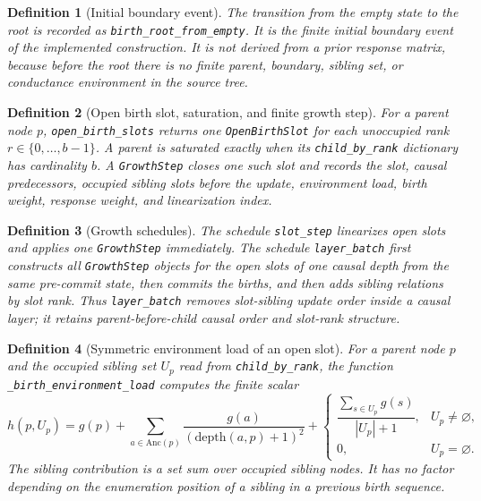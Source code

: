 \documentclass[11pt]{article}
\newtheorem{definition}{Definition}[section]
\theoremstyle{remark}
\newcommand{\code}[1]{\texttt{#1}}
\numberwithin{equation}{section}
\begin{document}
\begin{definition}[Initial boundary event]
The transition from the empty state to the root is recorded as \code{birth\_\allowbreak{}root\_\allowbreak{}from\_\allowbreak{}empty}. It is the finite initial boundary event of the implemented construction. It is not derived from a prior response matrix, because before the root there is no finite parent, boundary, sibling set, or conductance environment in the source tree.
\end{definition}

\begin{definition}[Open birth slot, saturation, and finite growth step]
For a parent node \(p\), \code{open\_\allowbreak{}birth\_\allowbreak{}slots} returns one \code{OpenBirthSlot} for each unoccupied rank \(r\in\{0,\ldots,b-1\}\). A parent is saturated exactly when its \code{child\_\allowbreak{}by\_\allowbreak{}rank} dictionary has cardinality \(b\). A \code{GrowthStep} closes one such slot and records the slot, causal predecessors, occupied sibling slots before the update, environment load, birth weight, response weight, and linearization index.
\end{definition}

\begin{definition}[Growth schedules]
The schedule \code{slot\_\allowbreak{}step} linearizes open slots and applies one \code{GrowthStep} immediately. The schedule \code{layer\_\allowbreak{}batch} first constructs all \code{GrowthStep} objects for the open slots of one causal depth from the same pre-commit state, then commits the births, and then adds sibling relations by slot rank. Thus \code{layer\_\allowbreak{}batch} removes slot-sibling update order inside a causal layer; it retains parent-before-child causal order and slot-rank structure.
\end{definition}

\begin{definition}[Symmetric environment load of an open slot]
For a parent node \(p\) and the occupied sibling set \(U_p\) read from \code{child\_\allowbreak{}by\_\allowbreak{}rank}, the function \code{\_birth\_\allowbreak{}environment\_\allowbreak{}load} computes the finite scalar
\begin{equation}
  h(p,U_p)=g(p)+\sum_{a\in \mathrm{Anc}(p)}\frac{g(a)}{(\mathrm{depth}(a,p)+1)^2}
  +\begin{cases}
    \dfrac{\sum_{s\in U_p} g(s)}{|U_p|+1}, & U_p\ne\varnothing,\\[0.4em]
    0, & U_p=\varnothing .
  \end{cases}
  \label{eq:birth-environment-load}
\end{equation}
The sibling contribution is a set sum over occupied sibling nodes. It has no factor depending on the enumeration position of a sibling in a previous birth sequence.
\end{definition}
\end{document}
